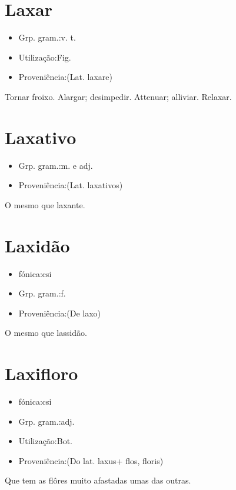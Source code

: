 \section{Laxar}
\begin{itemize}
\item {Grp. gram.:v. t.}
\end{itemize}
\begin{itemize}
\item {Utilização:Fig.}
\end{itemize}
\begin{itemize}
\item {Proveniência:(Lat. \textunderscore laxare\textunderscore )}
\end{itemize}
Tornar froixo.
Alargar; desimpedir.
Attenuar; alliviar.
Relaxar.
\section{Laxativo}
\begin{itemize}
\item {Grp. gram.:m.  e  adj.}
\end{itemize}
\begin{itemize}
\item {Proveniência:(Lat. \textunderscore laxativos\textunderscore )}
\end{itemize}
O mesmo que \textunderscore laxante\textunderscore .
\section{Laxidão}
\begin{itemize}
\item {fónica:csi}
\end{itemize}
\begin{itemize}
\item {Grp. gram.:f.}
\end{itemize}
\begin{itemize}
\item {Proveniência:(De \textunderscore laxo\textunderscore )}
\end{itemize}
O mesmo que \textunderscore lassidão\textunderscore .
\section{Laxifloro}
\begin{itemize}
\item {fónica:csi}
\end{itemize}
\begin{itemize}
\item {Grp. gram.:adj.}
\end{itemize}
\begin{itemize}
\item {Utilização:Bot.}
\end{itemize}
\begin{itemize}
\item {Proveniência:(Do lat. \textunderscore laxus\textunderscore  + \textunderscore flos\textunderscore , \textunderscore floris\textunderscore )}
\end{itemize}
Que tem as flôres muito afastadas umas das outras.
